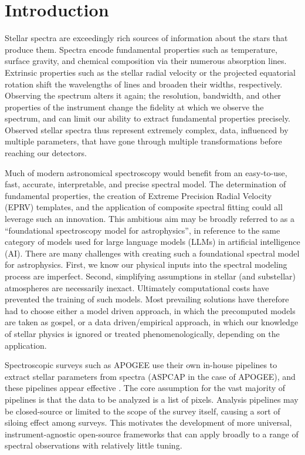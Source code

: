 \documentclass[twocolumn, linenumbers]{aastex631}
\begin{document}
\section{Introduction}
Stellar spectra are exceedingly rich sources of information about the stars that produce them. 
Spectra encode fundamental properties such as temperature, surface gravity, and chemical composition via their numerous absorption lines. 
Extrinsic properties such as the stellar radial velocity or the projected equatorial rotation shift the wavelengths of lines and broaden their widths, respectively. 
Observing the spectrum alters it again; the resolution, bandwidth, and other properties of the instrument change the fidelity at which we observe the spectrum, and can limit our ability to extract fundamental properties precisely.  
Observed stellar spectra thus represent extremely complex, data, influenced by multiple parameters, that have gone through multiple transformations before reaching our detectors.

Much of modern astronomical spectroscopy would benefit from an easy-to-use, fast, accurate, interpretable, and precise spectral model. 
The determination of fundamental properties, the creation of Extreme Precision Radial Velocity (EPRV) templates, and the application of composite spectral fitting could all leverage such an innovation. 
This ambitious aim may be broadly referred to as a ``foundational spectroscopy model for astrophysics'', in reference to the same category of models used for large language models (LLMs) in artificial intelligence (AI).
There are many challenges with creating such a foundational spectral model for astrophysics. 
First, we know our physical inputs into the spectral modeling process are imperfect. 
Second, simplifying assumptions in stellar (and substellar) atmospheres are necessarily inexact. 
Ultimately computational costs have prevented the training of such models.  
Most prevailing solutions have therefore had to choose either a model driven approach, in which the precomputed models are taken as gospel, or a data driven/empirical approach, in which our knowledge of stellar physics is ignored or treated phenomenologically, depending on the application.
 
Spectroscopic surveys such as APOGEE use their own in-house pipelines to extract stellar parameters from spectra (ASPCAP in the case of APOGEE), and these pipelines appear effective \citep{APOGEE, ASPCAP}. 
The core assumption for the vast majority of pipelines is that the data to be analyzed is a list of pixels. 
Analysis pipelines may be closed-source or limited to the scope of the survey itself, causing a sort of siloing effect among surveys. 
This motivates the development of more universal, instrument-agnostic open-source frameworks that can apply broadly to a range of spectral observations with relatively little tuning.
\end{document}
